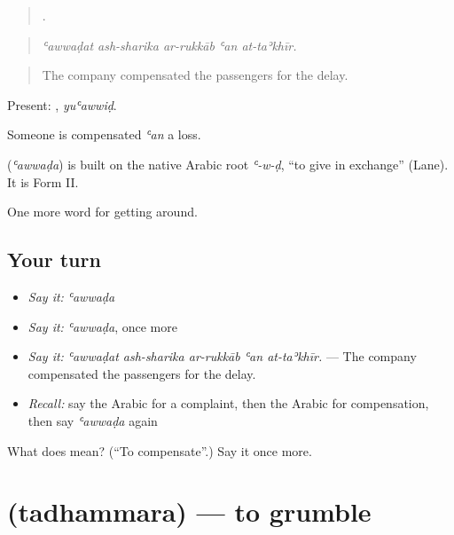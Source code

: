 \begin{quote}
    .
\end{quote}

\begin{quote}
\emph{ʿawwaḍat ash-sharika ar-rukkāb ʿan at-taʾkhīr.}
\end{quote}

\begin{quote}
The company compensated the passengers for the delay.
\end{quote}

Present: , \emph{yuʿawwiḍ}.

Someone is compensated \emph{ʿan} a loss.

\begin{cousinweb}
\textbf{} (\emph{ʿawwaḍa}) is built on the native Arabic root \emph{ʿ-w-ḍ}, \textquotedblleft{}to give in exchange\textquotedblright{} (Lane). It is Form II.
\end{cousinweb}

\begin{grammarlens}[title={What you've built}]
One more word for getting around.
\end{grammarlens}

\subsection*{Your turn}
\begin{itemize}
\raggedright
  \item \emph{Say it:} \emph{ʿawwaḍa}
  \item \emph{Say it:} \emph{ʿawwaḍa}, once more
  \item \emph{Say it:} \emph{ʿawwaḍat ash-sharika ar-rukkāb ʿan at-taʾkhīr.} — The company compensated the passengers for the delay.
  \item \emph{Recall:} say the Arabic for a complaint, then the Arabic for compensation, then say \emph{ʿawwaḍa} again
\end{itemize}

\begin{tcolorbox}[breakable,colback=teal!4,colframe=teal!35!black,title={Before you move on}]
What does  mean? (\textquotedblleft{}To compensate\textquotedblright{}.) Say it once more.
\end{tcolorbox}
\section[\texorpdfstring{\ar{تذمر} (tadhammara)}{تذمر (tadhammara)}]{ (tadhammara) — to grumble}

